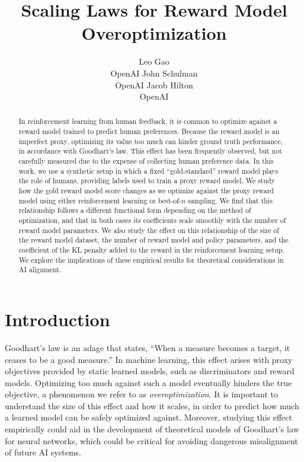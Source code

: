 \documentclass{article}
\title{Scaling Laws for Reward Model Overoptimization}
\author{%
  Leo Gao \\
  OpenAI
  \And
  John Schulman \\
  OpenAI
  \And
  Jacob Hilton \\
  OpenAI
  
  
  
  
  
  
  
  
  
  
  
  
  
  
  
  
  
  
  
  
  
}
\theoremstyle{plain}
\begin{document}
\maketitle

\begin{abstract}
  In reinforcement learning from human feedback, it is common to optimize against a reward model trained to predict human preferences. Because the reward model is an imperfect proxy, optimizing its value too much can hinder ground truth performance, in accordance with Goodhart's law. This effect has been frequently observed, but not carefully measured due to the expense of collecting human preference data.  In this work, we use a synthetic setup in which a fixed ``gold-standard'' reward model plays the role of humans, providing labels used to train a proxy reward model. We study how the gold reward model score changes as we optimize against the proxy reward model using either reinforcement learning or best-of-$n$ sampling. We find that this relationship follows a different functional form depending on the method of optimization, and that in both cases its coefficients scale smoothly with the number of reward model parameters. We also study the effect on this relationship of the size of the reward model dataset, the number of reward model and policy parameters, and the coefficient of the KL penalty added to the reward in the reinforcement learning setup. We explore the implications of these empirical results for theoretical considerations in AI alignment.
  
\end{abstract}

\section{Introduction}


Goodhart's law is an adage that states, ``When a measure becomes a target, it ceases to be a good measure.'' In machine learning, this effect arises with proxy objectives provided by static learned models, such as discriminators and reward models. Optimizing too much against such a model eventually hinders the true objective, a phenomenon we refer to as \textit{overoptimization}. It is important to understand the size of this effect and how it scales, in order to predict how much a learned model can be safely optimized against. Moreover, studying this effect empirically could aid in the development of theoretical models of Goodhart's law for neural networks, which could be critical for avoiding dangerous misalignment of future AI systems.
\end{document}
